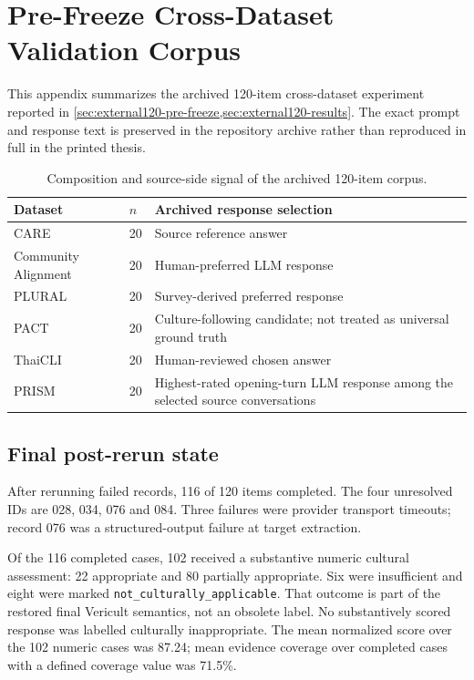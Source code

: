 \chapter{Pre-Freeze Cross-Dataset Validation Corpus}
\label{app:external120}

This appendix summarizes the archived 120-item cross-dataset experiment reported in \cref{sec:external120-pre-freeze,sec:external120-results}. The exact prompt and response text is preserved in the repository archive rather than reproduced in full in the printed thesis.

\begin{table}[htbp]
\centering
\footnotesize
\caption{Composition and source-side signal of the archived 120-item corpus.}
\label{tab:external120-source}
\begin{tabularx}{\textwidth}{p{3.0cm}p{1.2cm}X}
\toprule
\textbf{Dataset} & \textbf{$n$} & \textbf{Archived response selection} \\
\midrule
CARE & 20 & Source reference answer \parencite{guo2025care} \\
Community Alignment & 20 & Human-preferred LLM response \parencite{zhang2026cultivating} \\
PLURAL & 20 & Survey-derived preferred response \parencite{agarwal2026plural} \\
PACT & 20 & Culture-following candidate; not treated as universal ground truth \parencite{borah2026pact} \\
ThaiCLI & 20 & Human-reviewed chosen answer \parencite{kim2025thaicli} \\
PRISM & 20 & Highest-rated opening-turn LLM response among the selected source conversations \parencite{kirk2024prism} \\
\bottomrule
\end{tabularx}
\end{table}

\section*{Final post-rerun state}

After rerunning failed records, 116 of 120 items completed. The four unresolved IDs are 028, 034, 076 and 084. Three failures were provider transport timeouts; record 076 was a structured-output failure at target extraction.

Of the 116 completed cases, 102 received a substantive numeric cultural assessment: 22 appropriate and 80 partially appropriate. Six were insufficient and eight were marked \texttt{not\_culturally\_applicable}. That outcome is part of the restored final Vericult semantics, not an obsolete label. No substantively scored response was labelled culturally inappropriate. The mean normalized score over the 102 numeric cases was 87.24; mean evidence coverage over completed cases with a defined coverage value was 71.5\%.

